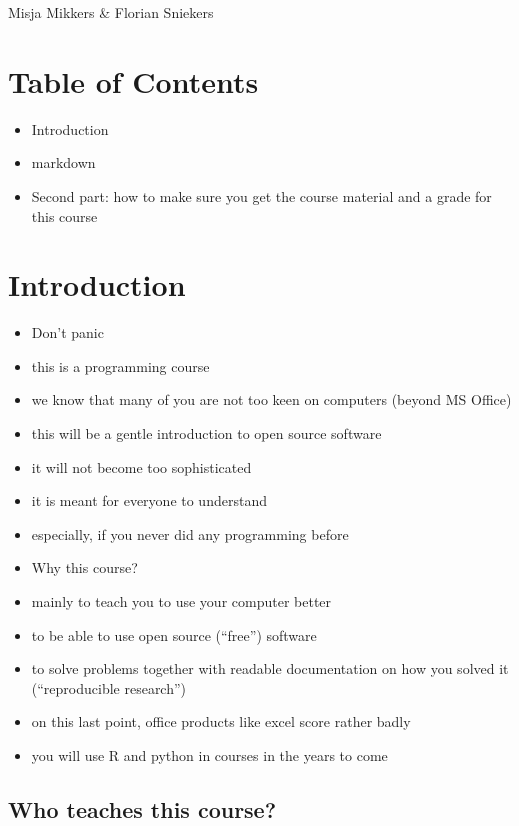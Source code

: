 \documentclass[]{book}
\providecommand{\tightlist}{%
  \setlength{\itemsep}{0pt}\setlength{\parskip}{0pt}}
\begin{document}
Misja Mikkers \& Florian Sniekers

\hypertarget{table-of-contents}{%
\section{Table of Contents}\label{table-of-contents}}

\begin{itemize}
\tightlist
\item
  Introduction
\item
  markdown
\item
  Second part: how to make sure you get the course material and a grade for this course
\end{itemize}

\hypertarget{introduction}{%
\section{Introduction}\label{introduction}}

\begin{itemize}
\tightlist
\item
  Don't panic
\item
  this is a programming course
\item
  we know that many of you are not too keen on computers (beyond MS Office)
\item
  this will be a gentle introduction to open source software
\item
  it will not become too sophisticated
\item
  it is meant for everyone to understand
\item
  especially, if you never did any programming before
\item
  Why this course?
\item
  mainly to teach you to use your computer better
\item
  to be able to use open source (``free'') software
\item
  to solve problems together with readable documentation on how you solved it (``reproducible research'')
\item
  on this last point, office products like excel score rather badly
\item
  you will use R and python in courses in the years to come
\end{itemize}

\hypertarget{who-teaches-this-course}{%
\subsection{Who teaches this course?}\label{who-teaches-this-course}}
\end{document}
